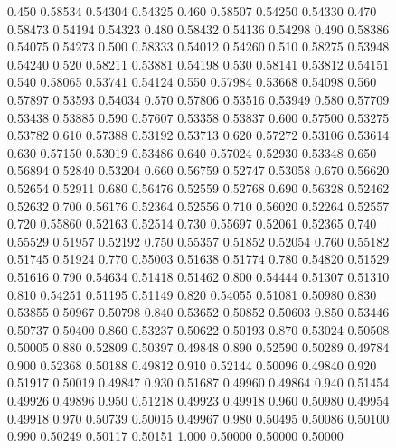 \documentclass[sigconf,nonacm]{acmart}
\begin{document}
\begin{figure}[t]
{0.450 0.58534 0.54304 0.54325
0.460 0.58507 0.54250 0.54330
0.470 0.58473 0.54194 0.54323
0.480 0.58432 0.54136 0.54298
0.490 0.58386 0.54075 0.54273
0.500 0.58333 0.54012 0.54260
0.510 0.58275 0.53948 0.54240
0.520 0.58211 0.53881 0.54198
0.530 0.58141 0.53812 0.54151
0.540 0.58065 0.53741 0.54124
0.550 0.57984 0.53668 0.54098
0.560 0.57897 0.53593 0.54034
0.570 0.57806 0.53516 0.53949
0.580 0.57709 0.53438 0.53885
0.590 0.57607 0.53358 0.53837
0.600 0.57500 0.53275 0.53782
0.610 0.57388 0.53192 0.53713
0.620 0.57272 0.53106 0.53614
0.630 0.57150 0.53019 0.53486
0.640 0.57024 0.52930 0.53348
0.650 0.56894 0.52840 0.53204
0.660 0.56759 0.52747 0.53058
0.670 0.56620 0.52654 0.52911
0.680 0.56476 0.52559 0.52768
0.690 0.56328 0.52462 0.52632
0.700 0.56176 0.52364 0.52556
0.710 0.56020 0.52264 0.52557
0.720 0.55860 0.52163 0.52514
0.730 0.55697 0.52061 0.52365
0.740 0.55529 0.51957 0.52192
0.750 0.55357 0.51852 0.52054
0.760 0.55182 0.51745 0.51924
0.770 0.55003 0.51638 0.51774
0.780 0.54820 0.51529 0.51616
0.790 0.54634 0.51418 0.51462
0.800 0.54444 0.51307 0.51310
0.810 0.54251 0.51195 0.51149
0.820 0.54055 0.51081 0.50980
0.830 0.53855 0.50967 0.50798
0.840 0.53652 0.50852 0.50603
0.850 0.53446 0.50737 0.50400
0.860 0.53237 0.50622 0.50193
0.870 0.53024 0.50508 0.50005
0.880 0.52809 0.50397 0.49848
0.890 0.52590 0.50289 0.49784
0.900 0.52368 0.50188 0.49812
0.910 0.52144 0.50096 0.49840
0.920 0.51917 0.50019 0.49847
0.930 0.51687 0.49960 0.49864
0.940 0.51454 0.49926 0.49896
0.950 0.51218 0.49923 0.49918
0.960 0.50980 0.49954 0.49918
0.970 0.50739 0.50015 0.49967
0.980 0.50495 0.50086 0.50100
0.990 0.50249 0.50117 0.50151
1.000 0.50000 0.50000 0.50000
}\ratiodata
{}
\end{figure}
\end{document}
